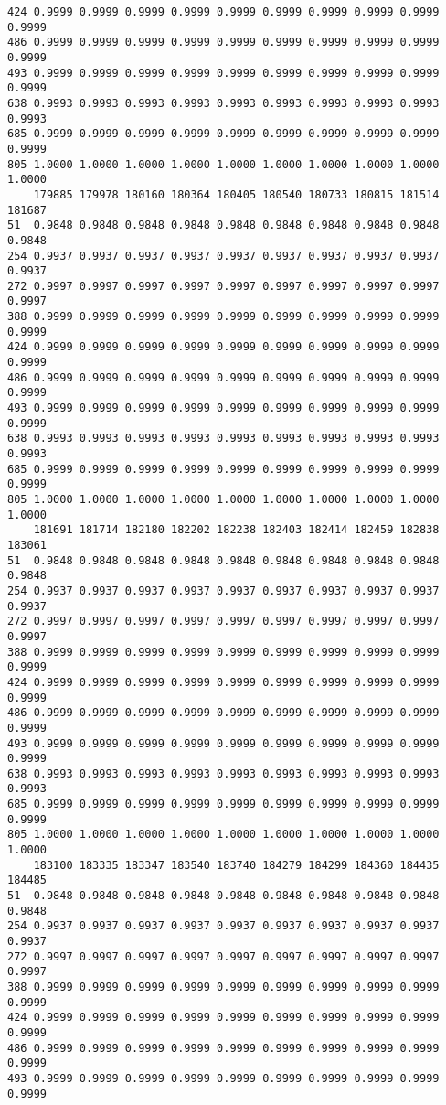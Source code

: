 \documentclass[
]{report}
\begin{document}
\begin{verbatim}
424 0.9999 0.9999 0.9999 0.9999 0.9999 0.9999 0.9999 0.9999 0.9999 0.9999
486 0.9999 0.9999 0.9999 0.9999 0.9999 0.9999 0.9999 0.9999 0.9999 0.9999
493 0.9999 0.9999 0.9999 0.9999 0.9999 0.9999 0.9999 0.9999 0.9999 0.9999
638 0.9993 0.9993 0.9993 0.9993 0.9993 0.9993 0.9993 0.9993 0.9993 0.9993
685 0.9999 0.9999 0.9999 0.9999 0.9999 0.9999 0.9999 0.9999 0.9999 0.9999
805 1.0000 1.0000 1.0000 1.0000 1.0000 1.0000 1.0000 1.0000 1.0000 1.0000
    179885 179978 180160 180364 180405 180540 180733 180815 181514 181687
51  0.9848 0.9848 0.9848 0.9848 0.9848 0.9848 0.9848 0.9848 0.9848 0.9848
254 0.9937 0.9937 0.9937 0.9937 0.9937 0.9937 0.9937 0.9937 0.9937 0.9937
272 0.9997 0.9997 0.9997 0.9997 0.9997 0.9997 0.9997 0.9997 0.9997 0.9997
388 0.9999 0.9999 0.9999 0.9999 0.9999 0.9999 0.9999 0.9999 0.9999 0.9999
424 0.9999 0.9999 0.9999 0.9999 0.9999 0.9999 0.9999 0.9999 0.9999 0.9999
486 0.9999 0.9999 0.9999 0.9999 0.9999 0.9999 0.9999 0.9999 0.9999 0.9999
493 0.9999 0.9999 0.9999 0.9999 0.9999 0.9999 0.9999 0.9999 0.9999 0.9999
638 0.9993 0.9993 0.9993 0.9993 0.9993 0.9993 0.9993 0.9993 0.9993 0.9993
685 0.9999 0.9999 0.9999 0.9999 0.9999 0.9999 0.9999 0.9999 0.9999 0.9999
805 1.0000 1.0000 1.0000 1.0000 1.0000 1.0000 1.0000 1.0000 1.0000 1.0000
    181691 181714 182180 182202 182238 182403 182414 182459 182838 183061
51  0.9848 0.9848 0.9848 0.9848 0.9848 0.9848 0.9848 0.9848 0.9848 0.9848
254 0.9937 0.9937 0.9937 0.9937 0.9937 0.9937 0.9937 0.9937 0.9937 0.9937
272 0.9997 0.9997 0.9997 0.9997 0.9997 0.9997 0.9997 0.9997 0.9997 0.9997
388 0.9999 0.9999 0.9999 0.9999 0.9999 0.9999 0.9999 0.9999 0.9999 0.9999
424 0.9999 0.9999 0.9999 0.9999 0.9999 0.9999 0.9999 0.9999 0.9999 0.9999
486 0.9999 0.9999 0.9999 0.9999 0.9999 0.9999 0.9999 0.9999 0.9999 0.9999
493 0.9999 0.9999 0.9999 0.9999 0.9999 0.9999 0.9999 0.9999 0.9999 0.9999
638 0.9993 0.9993 0.9993 0.9993 0.9993 0.9993 0.9993 0.9993 0.9993 0.9993
685 0.9999 0.9999 0.9999 0.9999 0.9999 0.9999 0.9999 0.9999 0.9999 0.9999
805 1.0000 1.0000 1.0000 1.0000 1.0000 1.0000 1.0000 1.0000 1.0000 1.0000
    183100 183335 183347 183540 183740 184279 184299 184360 184435 184485
51  0.9848 0.9848 0.9848 0.9848 0.9848 0.9848 0.9848 0.9848 0.9848 0.9848
254 0.9937 0.9937 0.9937 0.9937 0.9937 0.9937 0.9937 0.9937 0.9937 0.9937
272 0.9997 0.9997 0.9997 0.9997 0.9997 0.9997 0.9997 0.9997 0.9997 0.9997
388 0.9999 0.9999 0.9999 0.9999 0.9999 0.9999 0.9999 0.9999 0.9999 0.9999
424 0.9999 0.9999 0.9999 0.9999 0.9999 0.9999 0.9999 0.9999 0.9999 0.9999
486 0.9999 0.9999 0.9999 0.9999 0.9999 0.9999 0.9999 0.9999 0.9999 0.9999
493 0.9999 0.9999 0.9999 0.9999 0.9999 0.9999 0.9999 0.9999 0.9999 0.9999

\end{verbatim}
\end{document}
